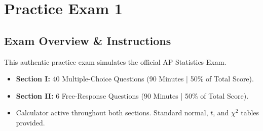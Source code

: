 ﻿%
\chapter{Practice Exam 1}

\section*{Exam Overview \& Instructions}
This authentic practice exam simulates the official AP Statistics Exam.
\begin{itemize}[leftmargin=1.2em]
  \item \textbf{Section I:} 40 Multiple-Choice Questions (90 Minutes | 50\% of Total Score).
  \item \textbf{Section II:} 6 Free-Response Questions (90 Minutes | 50\% of Total Score).
  \item Calculator active throughout both sections. Standard normal, $t$, and $\chi^2$ tables provided.
\end{itemize}

